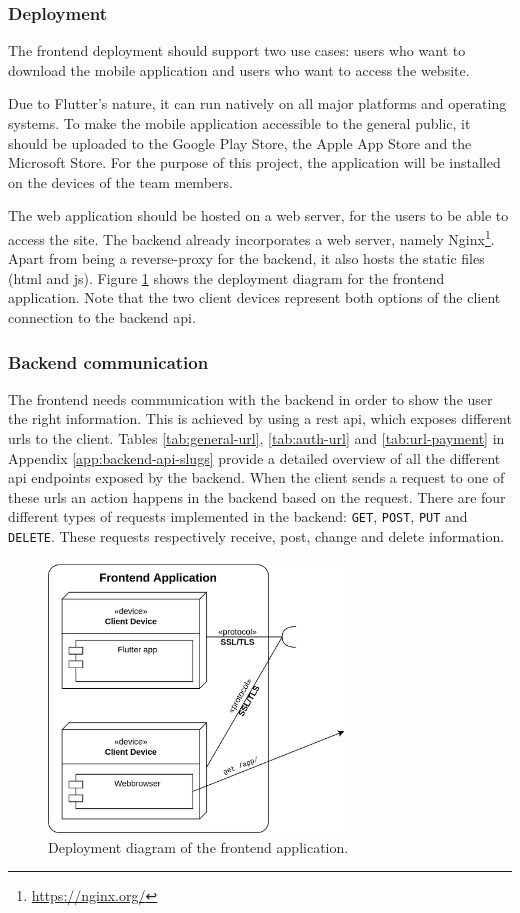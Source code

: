 \subsubsection{Deployment}
The frontend deployment should support two use cases: users who want to download the mobile application and users who want to access the website.

\ind Due to Flutter's nature, it can run natively on all major platforms and operating systems. To make the mobile application accessible to the general public, it should be uploaded to the Google Play Store, the Apple App Store and the Microsoft Store. For the purpose of this project, the application will be installed on the devices of the team members.

\ind The web application should be hosted on a web server, for the users to be able to access the site. The backend already incorporates a web server, namely Nginx\footnote{\url{https://nginx.org/}}. Apart from being a reverse-proxy for the backend, it also hosts the static files (\ac{html} and \ac{js}). Figure \ref{fig:deployment-frontend} shows the deployment diagram for the frontend application. Note that the two client devices represent both options of the client connection to the backend \ac{api}.


\subsubsection{Backend communication}
The frontend needs communication with the backend in order to show the user the right information. This is achieved by using a \ac{rest} \ac{api}, which exposes different \acp{url} to the client. Tables \ref{tab:general-url}, \ref{tab:auth-url} and \ref{tab:url-payment} in Appendix \ref{app:backend-api-slugs} provide a detailed overview of all the different \ac{api} endpoints exposed by the backend. When the client sends a request to one of these \acp{url} an action happens in the backend based on the request. There are four different types of requests implemented in the backend: \verb|GET|, \verb|POST|, \verb|PUT| and \verb|DELETE|. These requests respectively receive, post, change and delete information.

\begin{figure}[H]
    \centering
    \includegraphics[width=8cm]{images/deployment_diagrams/deployment_diagram-frontend.drawio.png}
    \caption{Deployment diagram of the frontend application.}
    \label{fig:deployment-frontend}
\end{figure}

